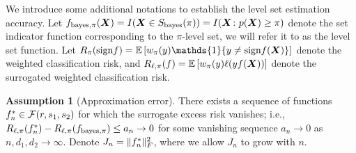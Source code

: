 \documentclass[11pt]{article}
\theoremstyle{definition}
\newtheorem{assumption}{Assumption}
\def\sign{\textup{sign}}
\def\bayesS{S_{\textup{bayes}}}
\def\bayespif{f_{\textup{bayes},\pi}}
\begin{document}
We introduce some additional notations to establish the level set estimation accuracy. Let $f_{\text{bayes},\pi}(\mX)=I(\mX\in \bayesS(\pi))=I(\mX\colon p(\mX) \geq \pi)$ denote the set indicator function corresponding to the $\pi$-level set, we will refer it to as the level set function. Let $R_{\pi}(\sign f)=\mathbb{E}\left[w_\pi(y)\mathds{1}\{y\neq \sign f(\mX)\}\right]$ denote the weighted classification risk, and $R_{\ell,\pi}(f)=\mathbb{E}\left[w_\pi(y)\ell(yf(\bm X))\right]$ denote the surrogated weighted classification risk. 

\begin{assumption}[Approximation error]\label{ass:main} 
There exists a sequence of functions $f_n^*\in\mathcal{F}(r,s_1,s_2)$ for which the surrogate excess risk vanishes; i.e., $R_{\ell,\pi}(f^*_n)-R_{\ell,\pi}(\bayespif)\leq a_n\to 0$ for some vanishing sequence $a_n\to 0$ as $n,d_1,d_2\to \infty$. Denote $J_n=\lVert f^*_n\rVert_F^2$, where we allow $J_n$ to grow with $n$. 
\end{assumption}
\end{document}
